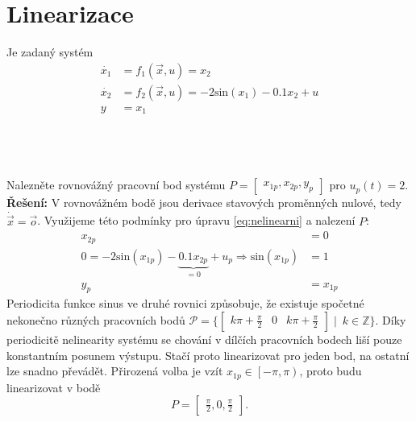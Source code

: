 \documentclass[twoside]{article}
\begin{document}
\section{Linearizace}
\label{sec:ukol3}
Je zadaný systém
\begin{equation}
	\begin{split}
		\dot{x_1} &= f_1(\vec{x}, u) = x_2 \\
		\dot{x_2} &= f_2(\vec{x}, u) = -2 \text{sin}(x_1) - 0.1x_2 +u \\
		y &= x_1
	\end{split}
	\label{eq:nelinearni}
\end{equation}

\subsection{~}
Nalezněte rovnovážný pracovní bod systému $P = \begin{bmatrix} x_{1p}, x_{2p}, y_p \end{bmatrix}$ pro $u_p (t) = 2$. \\
\textbf{Řešení:} V rovnovážném bodě jsou derivace stavových proměnných nulové, tedy $\dot{\vec{x}} = \vec{o}$.
Využijeme této podmínky pro úpravu \eqref{eq:nelinearni} a nalezení $P$:
\begin{equation}
	\begin{split}
		x_{2p} &= 0\\
		0 = -2 \text{sin}(x_{1p}) - \underbrace{0.1x_{2p}}_{=0} +u_p \Rightarrow \text{sin}(x_{1p}) &= 1 \\
		y_p &= x_{1p}
	\end{split}
\end{equation}
Periodicita funkce sinus ve druhé rovnici způsobuje, že existuje spočetné nekonečno různých pracovních bodů 
$\mathcal{P} = \{\begin{bmatrix} k\pi+\frac{\pi}{2} & 0 & k\pi+\frac{\pi}{2} \end{bmatrix} \mid\ k \in \mathbb{Z} \}$.
Díky periodicitě nelinearity systému se chování v dílčích pracovních bodech liší pouze konstantním posunem výstupu. Stačí proto linearizovat pro jeden bod, na ostatní lze snadno převádět.
Přirozená volba je vzít $x_{1p} \in \left[-\pi,\pi \right)$, proto budu linearizovat v bodě 
\begin{equation*}
	P = \begin{bmatrix} \frac{\pi}{2}, 0, \frac{\pi}{2} \end{bmatrix}.
\end{equation*}
\end{document}
